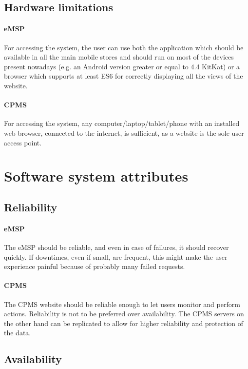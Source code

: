 \subsection{Hardware limitations} \label{hwlimitations}

\paragraph{eMSP} For accessing the system, the user can use both the application which should be available in all the main mobile stores and should run on most of the devices present nowadays (e.g. an Android version greater or equal to 4.4 KitKat) or a browser which supports at least ES6 for correctly displaying all the views of the website.

\paragraph{CPMS} For accessing the system, any computer/laptop/tablet/phone with an installed web browser, connected to the internet, is sufficient, as a website is the sole user access point.

\section{Software system attributes}

\subsection{Reliability}

\paragraph{eMSP} The eMSP should be reliable, and even in case of failures, it should recover quickly. If downtimes, even if small, are frequent, this might make the user experience painful because of probably many failed requests.

\paragraph{CPMS} The CPMS website should be reliable enough to let users monitor and perform actions. Reliability is not to be preferred over availability. The CPMS servers on the other hand can be replicated to allow for higher reliability and protection of the data.

\subsection{Availability}

